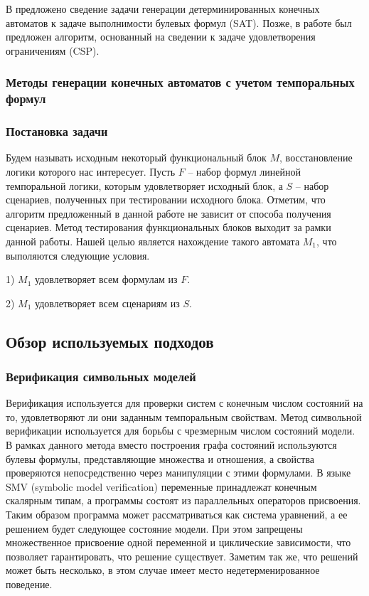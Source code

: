 \documentclass[14pt]{article}
\begin{document}
В \cite{sat} предложено сведение задачи генерации детерминированных конечных автоматов
к задаче выполнимости булевых формул (SAT). Позже, в работе \cite{csp} был предложен алгоритм, основанный на сведении к задаче
удовлетворения ограничениям (CSP).

\subsubsection{Методы генерации конечных автоматов с учетом темпоральных формул}

\subsubsection{Постановка задачи}

Будем называть исходным некоторый функциональный блок $M$, восстановление логики которого нас интересует.
Пусть $F$ -- набор формул линейной темпоральной логики, которым удовлетворяет исходный блок,
а $S$ -- набор сценариев, полученных при тестировании исходного блока.
Отметим, что алгоритм предложенный в данной работе не зависит от способа получения сценариев.
Метод тестирования функциональных блоков выходит за рамки данной работы.
Нашей целью является нахождение такого автомата $M_1$, что выполяются следующие условия.

1) $M_1$ удовлетворяет всем формулам из $F$.

2) $M_1$ удовлетворяет всем сценариям из $S$.

\subsection{Обзор используемых подходов}
\subsubsection{Верификация символьных моделей}

Верификация используется для проверки систем с
конечным числом состояний на то, удовлетворяют ли они заданным темпоральным
свойствам. Метод символьной верификации используется для борьбы с чрезмерным числом состояний модели. В рамках данного метода вместо построения графа
состояний используются булевы формулы, представляющие множества и отношения, а свойства проверяются непосредственно
через манипуляции с этими формулами. В языке SMV (symbolic model verification) переменные принадлежат конечным скалярным типам, а
программы состоят из параллельных операторов присвоения. Таким образом
программа может рассматриваться как система уравнений, а ее решением будет
следующее состояние модели. При этом запрещены множественное присвоение одной
переменной и циклические зависимости, что позволяет гарантировать, что решение
существует. Заметим так же, что решений может быть несколько, в этом случае имеет
место недетерменированное поведение.
\end{document}
